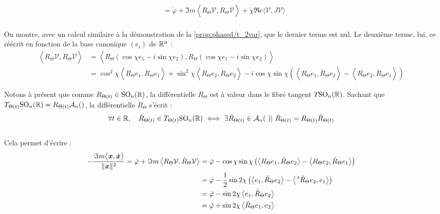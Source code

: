 \begin{demo}
\begin{align*}
		&= \dot{\varphi} + \Im m \left\langle R_\Theta \mathcal{V},   \dot{R}_{\Theta}\mathcal{V}\right\rangle + \dot{\chi} \Re e \big\langle \mathcal{V}, J\mathcal{V}\big\rangle
	\end{align*}
	\\
	On montre, avec un calcul similaire à la démonstration de la \cref{prop:phased/t_2var}, que le dernier terme est nul. Le deuxième terme, lui, ce réécrit en fonction de la base canonique $(e_i)$ de $\R^n$ :
	\begin{align*}
		\left\langle R_\Theta \mathcal{V},   \dot{R}_{\Theta}\mathcal{V}\right\rangle 
		&= \left\langle R_\Theta (\cos\chi e_1 -i\sin\chi e_2),   \dot{R}_{\Theta}(\cos\chi e_1 -i\sin\chi e_2)\right\rangle  \\
		&= \cos^2\chi \left\langle R_\Theta  e_1 ,   \dot{R}_{\Theta}e_1\right\rangle  + \sin^2\chi \left\langle R_\Theta e_2,   \dot{R}_{\Theta}e_2\right\rangle  
		- i \cos\chi  \sin\chi \left(\left\langle R_\Theta e_1,   \dot{R}_{\Theta} e_2\right\rangle - \left\langle R_\Theta e_2,   \dot{R}_{\Theta}e_1 \right\rangle\right) 
	\end{align*}
	
	Notons à présent que comme $R_{\Theta(t)}\in\SO_n(\R)$, la différentielle $\dot{R}_{\Theta}$ est à valeur dans le fibré tangent $\tg{\SO_n(\R)}$. Sachant que $\tg[\Theta(t)]{\SO_n(\R)} = R_{\Theta(t)}\asym{n}$, la différentielle $\dot{R}_\Theta$ s'écrit :
	\[\forall t\in\R,\quad \dot{R}_{\Theta(t)}\in \tg[\Theta(t)]{\SO_n(\R)}\ \Llr\ \exists \Tilde{R}_{\Theta(t)}\in\asym{n}\ |\ \dot{R}_{\Theta(t)} = R_{\Theta(t)} \Tilde{R}_{\Theta(t)}\]
	\\
	Cela permet d'écrire :
	\begin{align*}
		-\frac{\Im m\big\langle \bf{x},\dot{\bf{x}}\big\rangle}{\|\bf{x}\|^2} = \dot{\varphi} + \Im m \left\langle R_\Theta \mathcal{V},   \dot{R}_{\Theta}\mathcal{V}\right\rangle %
		&= \dot{\varphi} -  \cos\chi \sin\chi \left(\left\langle R_\Theta e_1,   \dot{R}_{\Theta} e_2\right\rangle - \left\langle R_\Theta e_2,   \dot{R}_{\Theta}e_1 \right\rangle\right) \\
		&= \dot{\varphi} - \frac{1}{2} \sin2\chi \left(\left\langle e_1,   \Tilde{R}_{\Theta} e_2\right\rangle - \left\langle \, ^t\Tilde{R}_\Theta e_2, e_1 \right\rangle\right) \\
		&= \dot{\varphi} - \sin2\chi \left\langle e_1, \Tilde{R}_{\Theta} e_2\right\rangle \\
		&= \dot{\varphi} + \sin2\chi \left\langle \Tilde{R}_{\Theta} e_1,  e_2\right\rangle
	\end{align*}
\end{demo}


